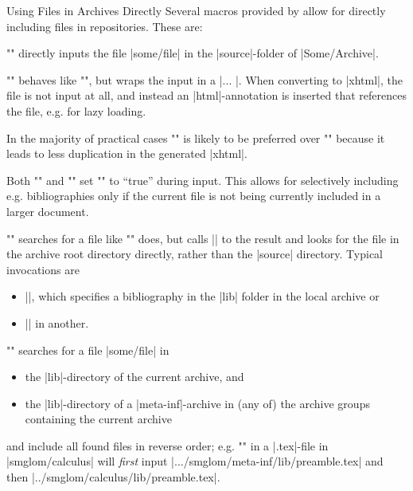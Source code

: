 \begin{sfragment}{Using Files in \sTeX Archives Directly}
    Several macros provided by \sTeX allow for directly including
    files in repositories. These are:
    \begin{function}{\mhinput}
        \stexcode"" directly
        inputs the file |some/file| in the |source|-folder of
        |Some/Archive|.
    \end{function}
    \begin{function}{}
      \stexcode"" behaves like \stexcode"\mhinput", but
      wraps the input in a |\begingroup ... \endgroup|. When converting to |xhtml|, the
      file is not input at all, and instead an |html|-annotation is inserted that
      references the file, e.g. for lazy loading. 

      In the majority of practical cases \stexcode"" is likely to be preferred
      over \stexcode"\mhinput" because it leads to less duplication in the generated
      |xhtml|.
    \end{function}
    \begin{function}{\ifinput}
        Both \stexcode"\mhinput" and \stexcode""
        set \stexcode"\ifinput" to ``true'' during input. This allows
        for selectively including e.g. bibliographies only if the
        current file is not being currently included in a larger document.
    \end{function}
    \begin{function}{\addmhbibresource}
      \stexcode"" searches for a file like
      \stexcode"\mhinput" does, but calls || to the result and looks for
      the file in the archive root directory directly, rather than the |source|
      directory. Typical invocations are
      \begin{itemize}
      \item ||, which specifies a bibliography in the |lib|
        folder in the local archive or
      \item || in another.
      \end{itemize}
    \end{function}
    \begin{function}{\libinput}
        \stexcode"" 
        searches for a file |some/file| in
        \begin{itemize}
            \item the |lib|-directory of the current archive, and
            \item the |lib|-directory of a |meta-inf|-archive in
                (any of) the archive groups containing the current archive
        \end{itemize}
        and include all found files in reverse order; 
        e.g. \stexcode"" in a |.tex|-file in
        |smglom/calculus| will \emph{first} input |.../smglom/meta-inf/lib/preamble.tex|
        and then |../smglom/calculus/lib/preamble.tex|. 


\end{function}
\end{sfragment}
